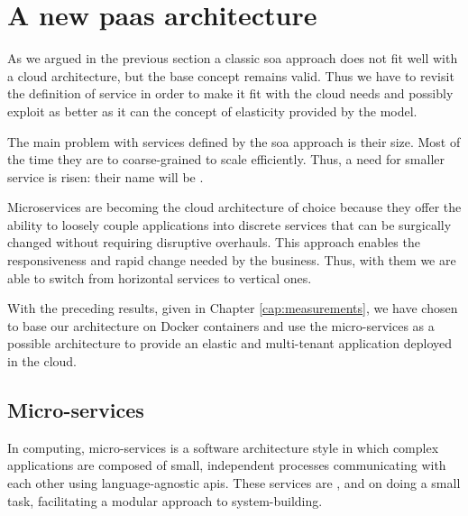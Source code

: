 %
%
\section{A new \acs{paas} architecture}
\label{sec:architecture-proposal}
As we argued in the previous section a classic \ac{soa} approach does not fit well with a cloud
architecture, but the base concept remains valid. Thus we have to revisit the definition of
service in order to make it fit with the cloud needs and possibly exploit as better as it can the
concept of elasticity provided by the model.

The main problem with services defined by the \ac{soa} approach is their size. Most of the time they
are to coarse-grained to scale efficiently. Thus, a need for smaller service is risen: their name will
be .

Microservices are becoming the cloud architecture of choice because they offer the ability to 
loosely couple applications into discrete services that can be surgically changed without requiring
disruptive overhauls. This approach enables the responsiveness and rapid change needed by the business.
Thus, with them we are able to switch from horizontal services to vertical ones.

With the preceding results, given in Chapter \ref{cap:measurements}, we have chosen to base our
architecture on Docker containers and use the micro-services as a possible architecture to provide an
elastic and multi-tenant application deployed in the cloud.

\subsection{Micro-services}
\label{sec:architecture-proposal-microservices}
In computing, micro-services is a software architecture style in which complex applications are
composed of small, independent processes communicating with each other using language-agnostic 
\acs{api}s. These services are ,  and 
 on doing a small task, facilitating a modular approach to system-building.

